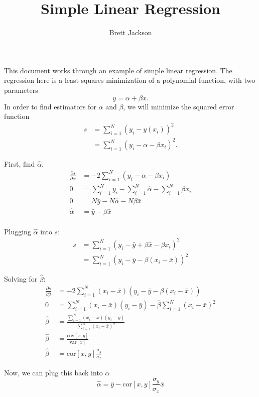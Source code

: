 \documentclass[11pt,a4paper]{article}
\title{Simple Linear Regression}
\author{Brett Jackson}
\begin{document}
\maketitle
This document works through an example of simple linear regression.
The regression here is a least squares minimization of a polynomial function,
with two parameters
\begin{equation}
  y = \alpha + \beta x.
\end{equation}
In order to find estimators for $\alpha$ and $\beta$, we will minimize the
squared error function
\begin{equation}
  \begin{split}
    s & = \sum_{i=1}^{N} (y_i - y(x_i))^{2} \\
      & = \sum_{i=1}^{N} (y_i - \alpha - \beta x_i)^{2}.
  \end{split}
\end{equation}

First, find $\hat{\alpha}$.
\begin{equation}
\begin{split}
  \frac{\partial s}{\partial \alpha}
    & = -2\sum_{i=1}^{N} (y_i - \alpha - \beta x_i) \\
  0 & = \sum_{i=1}^{N} y_i 
      - \sum_{i=1}^{N} \hat{\alpha}
      - \sum_{i=1}^{N} \beta x_i \\
  0 & = N\bar{y}
      - N\hat{\alpha}
      - N\beta\bar{x} \\
  \hat{\alpha} & = \bar{y}
                 - \beta \bar{x} \\
\end{split}
\end{equation}

Plugging $\hat{\alpha}$ into $s$:
\begin{equation}
\begin{split}
  s & = \sum_{i=1}^{N} (y_i - \bar{y} + \beta \bar{x} - \beta x_i)^{2} \\
    & = \sum_{i=1}^{N} (y_i - \bar{y} - \beta (x_i - \bar{x}) )^{2}
\end{split}
\end{equation}

Solving for $\hat{\beta}$:
\begin{equation}
\begin{split}
  \frac{\partial s}{\partial \beta}
    & = -2 \sum_{i=1}^{N}
        (x_i - \bar{x}) (y_i - \bar{y} - \beta (x_i - \bar{x}) ) \\
  0 & = \sum_{i=1}^{N} (x_i - \bar{x})(y_i - \bar{y})
      - \hat{\beta} \sum_{i=1}^{N} (x_i - \bar{x})^{2} \\
  \hat{\beta}
    & = \frac{\sum_{i=1}^{N} (x_i - \bar{x})(y_i - \bar{y})}
             {\sum_{i=1}^{N} (x_i - \bar{x})^{2}} \\
  \hat{\beta} & = \frac{\mathrm{cov}[x,y]}{\mathrm{var}[x]} \\
  \hat{\beta} & = \mathrm{cor}[x,y] \frac{\sigma_y}{\sigma_x}
\end{split}
\end{equation}

Now, we can plug this back into $\hat{\alpha}$
\begin{equation}
  \hat{\alpha} = \bar{y}
               - \mathrm{cor}[x,y] \frac{\sigma_y}{\sigma_x} \bar{x}
\end{equation}
\end{document}

